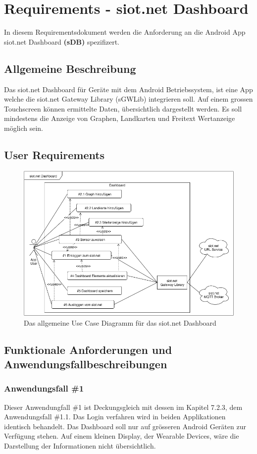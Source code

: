 \newpage

\section{Requirements - siot.net Dashboard}
In diesem Requirementsdokument werden die Anforderung an die Android App siot.net Dashboard \textbf{(sDB)} spezifizert.
\subsection{Allgemeine Beschreibung}
Das siot.net Dashboard für Geräte mit dem Android Betriebssystem, ist eine App welche die siot.net Gateway Library (sGWLib) integrieren soll. Auf einem grossen Touchscreen können ermittelte Daten, übersichtlich dargestellt werden. Es soll mindestens die Anzeige von Graphen, Landkarten und Freitext Wertanzeige möglich sein.
\subsection{User Requirements}
\begin{figure}[h]
  \centering
  \includegraphics[scale=0.65]{98_Bilder/08_Requirements/UseCaseDashboard}
  \caption[Use Case siot.net Sensorcenter]{Das allgemeine Use Case Diagramm für das siot.net Dashboard}
\end{figure}
\newpage
\subsection{Funktionale Anforderungen und Anwendungsfallbeschreibungen}
\subsubsection{Anwendungsfall \#1}
Dieser Anwendungfall \#1 ist Deckungsgleich mit dessen im Kapitel 7.2.3, dem Anwendungsfall \#1.1. Das Login verfahren wird in beiden Applikationen identisch behandelt. Das Dashboard soll nur auf grösseren Android Geräten zur Verfügung stehen. Auf einem kleinen Display, der Wearable Devices, wäre die Darstellung der Informationen nicht übersichtlich.

